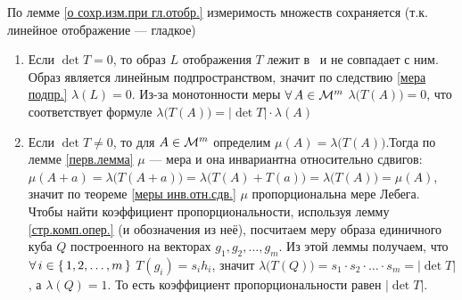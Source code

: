 \begin{prf} По лемме \ref{о сохр.изм.при гл.отобр.} измеримость множеств сохраняется (т.к. линейное отображение --- гладкое)
	\begin{enumerate}
		\item Если $\det T = 0$, то образ $L$ отображения $T$ лежит в \rmm\ и не совпадает с ним. Образ является линейным подпространством, значит по следствию \ref{мера подпр.} $\lambda(L) = 0$. %
		Из-за монотонности меры $\forall \, A \in \mathcal{M}^m$ $\lambda\bigl(T(A)\bigr) = 0$, что соответствует формуле $\lambda\bigl(T(A)\bigr) = |\det T| \cdot \lambda(A)$
		
		\item Если $\det T \ne 0$, то для $A \in \mathcal{M}^m$ определим $\mu(A) = \lambda\bigl(T(A)\bigr)$.Тогда по лемме \ref{перв.лемма} $\mu$ --- мера и она инвариантна относительно сдвигов: $\mu(A + a) = \lambda\bigl(T(A + a)\bigr) = \lambda\bigl(T(A) + T(a)\bigr) = \lambda\bigl(T(A)\bigr) = \mu(A)$, значит по теореме \ref{меры инв.отн.сдв.} $\mu$ пропорциональна мере Лебега. Чтобы найти коэффициент пропорциональности, используя лемму \ref{стр.комп.опер.} (и обозначения из неё), посчитаем меру образа единичного куба $Q$ построенного на векторах $g_1, g_2, \ldots, g_m$. Из этой леммы получаем, что $\forall \, i \in \{\,1, 2, \ldots, m\,\}$ $T(g_i) = s_i h_i$, значит $\lambda\bigl(T(Q)\bigr) = s_1 \cdot s_2 \cdot \ldots \cdot s_m = |\det T|$ , а $\lambda(Q) = 1$. То есть коэффициент пропорциональности равен $|\det T|$.
		\end{enumerate}
\end{prf}

